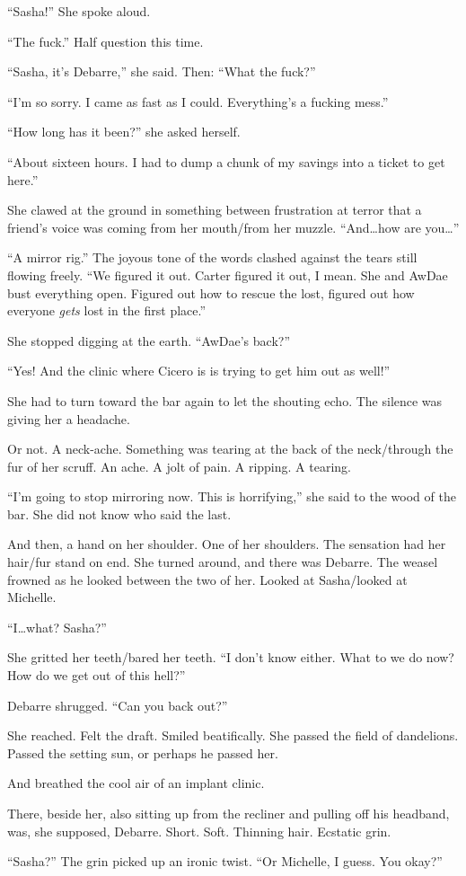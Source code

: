 ``Sasha!'' She spoke aloud.

``The fuck.'' Half question this time.

``Sasha, it's Debarre,'' she said. Then: ``What the fuck?''

``I'm so sorry. I came as fast as I could. Everything's a fucking mess.''

``How long has it been?'' she asked herself.

``About sixteen hours. I had to dump a chunk of my savings into a ticket to get here.''

She clawed at the ground in something between frustration at terror that a friend's voice was coming from her mouth/from her muzzle. ``And\ldots{}how are you\ldots{}''

``A mirror rig.'' The joyous tone of the words clashed against the tears still flowing freely. ``We figured it out. Carter figured it out, I mean. She and AwDae bust everything open. Figured out how to rescue the lost, figured out how everyone \emph{gets} lost in the first place.''

She stopped digging at the earth. ``AwDae's back?''

``Yes! And the clinic where Cicero is is trying to get him out as well!''

She had to turn toward the bar again to let the shouting echo. The silence was giving her a headache.

Or not. A neck-ache. Something was tearing at the back of the neck/through the fur of her scruff. An ache. A jolt of pain. A ripping. A tearing.

``I'm going to stop mirroring now. This is horrifying,'' she said to the wood of the bar. She did not know who said the last.

And then, a hand on her shoulder. One of her shoulders. The sensation had her hair/fur stand on end. She turned around, and there was Debarre. The weasel frowned as he looked between the two of her. Looked at Sasha/looked at Michelle.

``I\ldots{}what? Sasha?''

She gritted her teeth/bared her teeth. ``I don't know either. What to we do now? How do we get out of this hell?''

Debarre shrugged. ``Can you back out?''

She reached. Felt the draft. Smiled beatifically. She passed the field of dandelions. Passed the setting sun, or perhaps he passed her.

And breathed the cool air of an implant clinic.

There, beside her, also sitting up from the recliner and pulling off his headband, was, she supposed, Debarre. Short. Soft. Thinning hair. Ecstatic grin.

``Sasha?'' The grin picked up an ironic twist. ``Or Michelle, I guess. You okay?''
